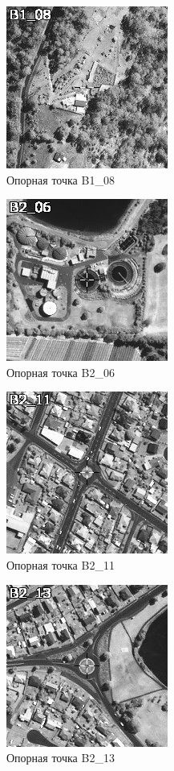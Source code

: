\documentclass[
  12pt,
]{book}
\begin{document}
\begin{figure}
\centering
\includegraphics{images/Ref17/B1_08.jpeg}
\caption{Опорная точка B1\_08}
\end{figure}

\begin{figure}
\centering
\includegraphics{images/Ref17/B2_06.jpeg}
\caption{Опорная точка B2\_06}
\end{figure}

\begin{figure}
\centering
\includegraphics{images/Ref17/B2_11.jpeg}
\caption{Опорная точка B2\_11}
\end{figure}

\begin{figure}
\centering
\includegraphics{images/Ref17/B2_13.jpeg}
\caption{Опорная точка B2\_13}
\end{figure}
\end{document}
